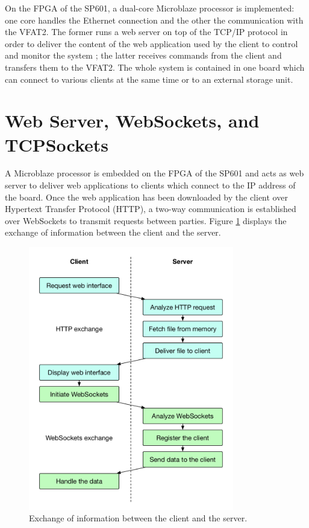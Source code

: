     On the FPGA of the SP601, a dual-core Microblaze processor is implemented: one core handles the Ethernet connection and the other the communication with the VFAT2. The former runs a web server on top of the TCP/IP protocol in order to deliver the content of the web application used by the client to control and monitor the system ; the latter receives commands from the client and transfers them to the VFAT2. The whole system is contained in one board which can connect to various clients at the same time or to an external storage unit.

  \section{Web Server, WebSockets, and TCPSockets}

    A Microblaze processor is embedded on the FPGA of the SP601 and acts as web server to deliver web applications to clients which connect to the IP address of the board. Once the web application has been downloaded by the client over Hypertext Transfer Protocol (HTTP), a two-way communication is established over WebSockets to transmit requests between parties. Figure \ref{fig:III-2-flow} displays the exchange of information between the client and the server.

    \begin{figure}[p!]
      \centering
      \includegraphics[width=0.8\textwidth]{img/III-2-web-daq/flow}
      \caption{Exchange of information between the client and the server.}
      \label{fig:III-2-flow}
    \end{figure}

